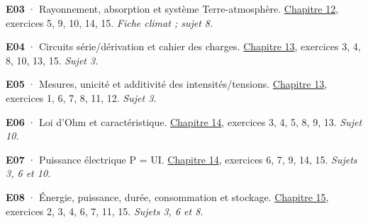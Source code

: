 \par\noindent\begin{minipage}{\linewidth}\textbf{E03} · Rayonnement, absorption et système Terre-atmosphère. \hyperref[chap-12]{Chapitre 12}, exercices 5, 9, 10, 14, 15. \emph{Fiche climat ; sujet 8.}\par\end{minipage}\par\vspace{2mm}
\par\noindent\begin{minipage}{\linewidth}\textbf{E04} · Circuits série/dérivation et cahier des charges. \hyperref[chap-13]{Chapitre 13}, exercices 3, 4, 8, 10, 13, 15. \emph{Sujet 3.}\par\end{minipage}\par\vspace{2mm}
\par\noindent\begin{minipage}{\linewidth}\textbf{E05} · Mesures, unicité et additivité des intensités/tensions. \hyperref[chap-13]{Chapitre 13}, exercices 1, 6, 7, 8, 11, 12. \emph{Sujet 3.}\par\end{minipage}\par\vspace{2mm}
\par\noindent\begin{minipage}{\linewidth}\textbf{E06} · Loi d’Ohm et caractéristique. \hyperref[chap-14]{Chapitre 14}, exercices 3, 4, 5, 8, 9, 13. \emph{Sujet 10.}\par\end{minipage}\par\vspace{2mm}
\par\noindent\begin{minipage}{\linewidth}\textbf{E07} · Puissance électrique P = UI. \hyperref[chap-14]{Chapitre 14}, exercices 6, 7, 9, 14, 15. \emph{Sujets 3, 6 et 10.}\par\end{minipage}\par\vspace{2mm}
\par\noindent\begin{minipage}{\linewidth}\textbf{E08} · Énergie, puissance, durée, consommation et stockage. \hyperref[chap-15]{Chapitre 15}, exercices 2, 3, 4, 6, 7, 11, 15. \emph{Sujets 3, 6 et 8.}\par\end{minipage}\par\vspace{2mm}
